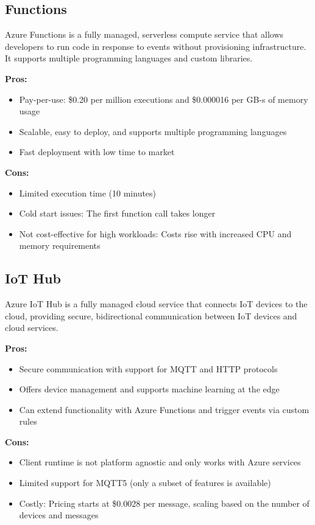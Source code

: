 \subsection*{Functions}
\label{azure:functions}
Azure Functions is a fully managed, serverless compute service that allows developers to run code in response to events without provisioning infrastructure. It supports multiple programming languages and custom libraries.

\textbf{Pros:}
\begin{itemize}
    \item Pay-per-use: \$0.20 per million executions and \$0.000016 per GB-s of memory usage
    \item Scalable, easy to deploy, and supports multiple programming languages
    \item Fast deployment with low time to market
\end{itemize}

\textbf{Cons:}
\begin{itemize}
    \item Limited execution time (10 minutes)
    \item Cold start issues: The first function call takes longer
    \item Not cost-effective for high workloads: Costs rise with increased CPU and memory requirements
\end{itemize}

\subsection*{IoT Hub}
\label{azure:iot-hub}
Azure IoT Hub is a fully managed cloud service that connects IoT devices to the cloud, providing secure, bidirectional communication between IoT devices and cloud services.

\textbf{Pros:}
\begin{itemize}
    \item Secure communication with support for MQTT and HTTP protocols
    \item Offers device management and supports machine learning at the edge
    \item Can extend functionality with Azure Functions and trigger events via custom rules
\end{itemize}

\textbf{Cons:}
\begin{itemize}
    \item Client runtime is not platform agnostic and only works with Azure services
    \item Limited support for MQTT5 (only a subset of features is available)
    \item Costly: Pricing starts at \$0.0028 per message, scaling based on the number of devices and messages
\end{itemize}

